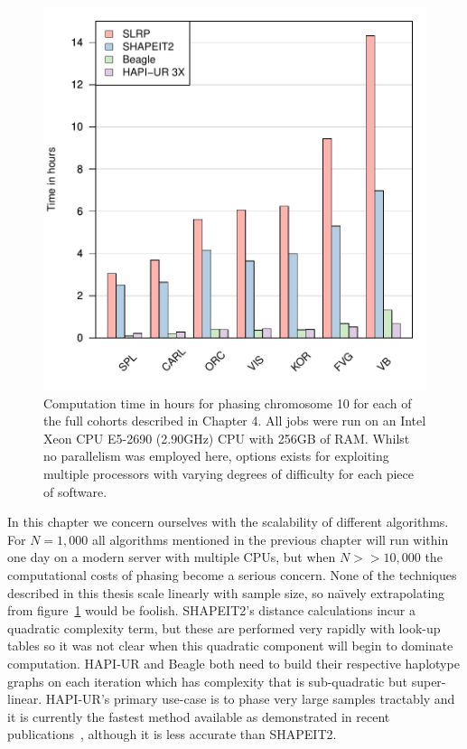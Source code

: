 \begin{figure}
  \centering
  \includegraphics[width=.5\textwidth]{chap4figs/timingsummary}    
  \caption[Summary of phasing computation for isolates cohorts]{Computation time in hours for phasing chromosome 10 for each of the full cohorts described in Chapter 4.  All jobs were run on an Intel Xeon CPU E5-2690 (2.90GHz) CPU with 256GB of RAM.  Whilst no parallelism was employed here, options exists for exploiting multiple processors with varying degrees of difficulty for each piece of software.  \label{fig:timing-summary}}
\end{figure}
\newpage
In this chapter we concern ourselves with the scalability of different algorithms.  For $N=1,000$ all algorithms mentioned in the previous chapter will run within one day on a modern server with multiple CPUs, but when $N>>10,000$ the computational costs of phasing become a serious concern.  None of the techniques described in this thesis scale linearly with sample size, so na\"{\i}vely extrapolating from figure~\ref{fig:timing-summary} would be foolish.  SHAPEIT2's distance calculations incur a quadratic complexity term, but these are performed very rapidly with look-up tables so it was not clear when this quadratic component will begin to dominate computation. HAPI-UR and Beagle both need to build their respective haplotype graphs on each iteration which has complexity that is sub-quadratic but super-linear.  HAPI-UR's primary use-case is to phase very large samples tractably and it is currently the fastest method available as demonstrated in recent publications~\citep{williams2012phasing,delaneau2013}, although it is less accurate than SHAPEIT2.


